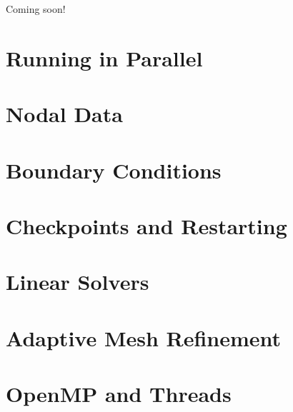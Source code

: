 Coming soon!

\section{Running in Parallel}

\section{Nodal Data}

\section{Boundary Conditions}

\section{Checkpoints and Restarting}

\section{Linear Solvers}

\section{Adaptive Mesh Refinement}

\section{OpenMP and Threads}
